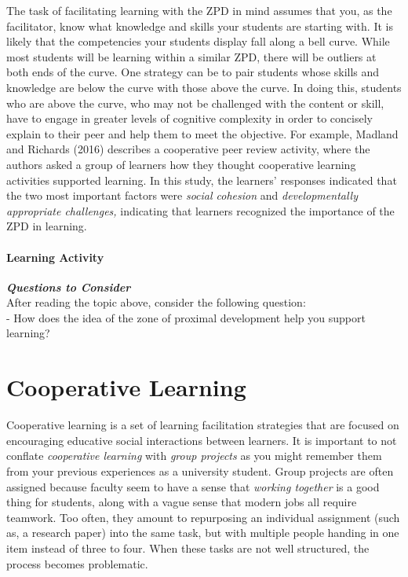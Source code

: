 \documentclass[
]{book}
\begin{document}
The task of facilitating learning with the ZPD in mind assumes that you, as the facilitator, know what knowledge and skills your students are starting with. It is likely that the competencies your students display fall along a bell curve. While most students will be learning within a similar ZPD, there will be outliers at both ends of the curve. One strategy can be to pair students whose skills and knowledge are below the curve with those above the curve. In doing this, students who are above the curve, who may not be challenged with the content or skill, have to engage in greater levels of cognitive complexity in order to concisely explain to their peer and help them to meet the objective. For example, Madland and Richards (2016) describes a cooperative peer review activity, where the authors asked a group of learners how they thought cooperative learning activities supported learning. In this study, the learners' responses indicated that the two most important factors were \emph{social cohesion} and \emph{developmentally appropriate challenges,} indicating that learners recognized the importance of the ZPD in learning.

\begin{reflect}
\hypertarget{learning-activity}{%
\paragraph{Learning Activity}\label{learning-activity}}

\textbf{\emph{Questions to Consider}}\\
After reading the topic above, consider the following question:\\
- How does the idea of the zone of proximal development help you support
learning?
\end{reflect}

\hypertarget{cooperative-learning}{%
\section{Cooperative Learning}\label{cooperative-learning}}

Cooperative learning is a set of learning facilitation strategies that are focused on encouraging educative social interactions between learners. It is important to not conflate \emph{cooperative learning} with \emph{group projects} as you might remember them from your previous experiences as a university student. Group projects are often assigned because faculty seem to have a sense that \emph{working together} is a good thing for students, along with a vague sense that modern jobs all require teamwork. Too often, they amount to repurposing an individual assignment (such as, a research paper) into the same task, but with multiple people handing in one item instead of three to four. When these tasks are not well structured, the process becomes problematic.
\end{document}
